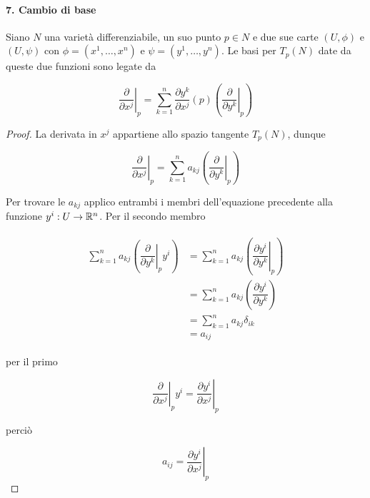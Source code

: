 \paragraph{7. Cambio di base}

Siano $ N $ una varietà differenziabile, un suo punto $ p \in N $ e due sue carte $ (U,\phi) $ e $ (U,\psi) $ con $ \phi = (x^{1},\dots,x^{n}) $ e $ \psi = (y^{1},\dots,y^{n}) $. Le basi per $ T_{p}(N) $ date da queste due funzioni sono legate da

\begin{equation}
	\left. \dfrac{\partial}{\partial x^{j}} \right|_{p} = \sum_{k=1}^{n} \dfrac{\partial y^{k}}{\partial x^{j}} (p) \left( \left. \dfrac{\partial}{\partial y^{k}} \right|_{p} \right)
\end{equation}

\begin{proof}
	La derivata in $ x^{j} $ appartiene allo spazio tangente $ T_{p}(N) $, dunque
	
	\begin{equation}
		\left. \dfrac{\partial}{\partial x^{j}} \right|_{p} = \sum_{k=1}^{n} a_{kj} \left( \left. \dfrac{\partial}{\partial y^{k}} \right|_{p} \right)
	\end{equation}

	Per trovare le $ a_{kj} $ applico entrambi i membri dell'equazione precedente alla funzione $ y^{i} : U \to \mathbb{R}^{n} $. Per il secondo membro
	
	\begin{align}
		\begin{split}
			\sum_{k=1}^{n} a_{kj} \left( \left. \dfrac{\partial}{\partial y^{k}} \right|_{p} y^{i} \right) &= \sum_{k=1}^{n} a_{kj} \left( \left. \dfrac{\partial y^{i}}{\partial y^{k}} \right|_{p} \right)\\
			&= \sum_{k=1}^{n} a_{kj} \left( \dfrac{\partial y^{i}}{\partial y^{k}}\right)\\
			&= \sum_{k=1}^{n} a_{kj} \delta_{ik}\\
			&= a_{ij}
		\end{split}
	\end{align}

	per il primo
	
	\begin{equation}
		\left. \dfrac{\partial}{\partial x^{j}} \right|_{p} y^{i} = \left. \dfrac{\partial y^{i}}{\partial x^{j}} \right|_{p}
	\end{equation}

	perciò
	
	\begin{equation}
		a_{ij} = \left. \dfrac{\partial y^{i}}{\partial x^{j}} \right|_{p}
	\end{equation}
\end{proof}

